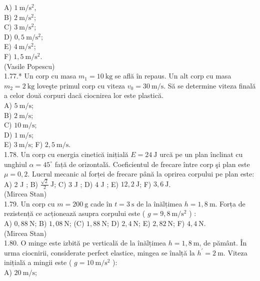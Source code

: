 \documentclass[10pt]{article}
\begin{document}
A) $1 \mathrm{~m} / \mathrm{s}^{2}$,\\
B) $2 \mathrm{~m} / \mathrm{s}^{2}$;\\
C) $3 \mathrm{~m} / \mathrm{s}^{2}$;\\
D) $0,5 \mathrm{~m} / \mathrm{s}^{2}$;\\
E) $4 \mathrm{~m} / \mathrm{s}^{2}$;\\
F) $1,5 \mathrm{~m} / \mathrm{s}^{2}$.\\
(Vasile Popescu)\\
1.77.* Un corp cu masa $m_{1}=10 \mathrm{~kg}$ se află în repaus. Un alt corp cu masa $m_{2}=2 \mathrm{~kg}$ loveşte primul corp cu viteza $v_{0}=30 \mathrm{~m} / \mathrm{s}$. Să se determine viteza finală a celor două corpuri dacă ciocnirea lor este plastică.\\
A) $5 \mathrm{~m} / \mathrm{s}$;\\
B) $2 \mathrm{~m} / \mathrm{s}$;\\
C) $10 \mathrm{~m} / \mathrm{s}$;\\
D) $1 \mathrm{~m} / \mathrm{s}$;\\
E) $3 \mathrm{~m} / \mathrm{s}$; F) $2,5 \mathrm{~m} / \mathrm{s}$.\\
1.78. Un corp cu energia cinetică inițială $E=24 \mathrm{~J}$ urcă pe un plan înclinat cu unghiul $\alpha=45^{\circ}$ față de orizontală. Coeficientul de frecare între corp şi plan este $\mu=0,2$. Lucrul mecanic al forței de frecare până la oprirea corpului pe plan este:\\
A) 2 J ; B) $\frac{\sqrt{2}}{2} \mathrm{~J}$; C) 3 J ; D) 4 J ; E) $12,2 \mathrm{~J}$; F) $3,6 \mathrm{~J}$.\\
(Mircea Stan)\\
1.79. Un corp cu $m=200 \mathrm{~g}$ cade în $t=3 \mathrm{~s}$ de la înălțimea $h=1,8 \mathrm{~m}$. Forța de rezistență ce acționează asupra corpului este ( $g=9,8 \mathrm{~m} / \mathrm{s}^{2}$ ) :\\
A) $0,88 \mathrm{~N}$; B) $1,08 \mathrm{~N}$; (C) $1,88 \mathrm{~N}$; D) $2,4 \mathrm{~N}$; E) $2,82 \mathrm{~N}$; F) $4,4 \mathrm{~N}$.\\
(Mircea Stan)\\
1.80. O minge este izbită pe verticală de la înălțimea $h=1,8 \mathrm{~m}$, de pământ. În urma ciocnirii, considerate perfect elastice, mingea se înalță la $h^{\prime}=2 \mathrm{~m}$. Viteza inițială a mingii este ( $g=10 \mathrm{~m} / \mathrm{s}^{2}$ ):\\
A) $20 \mathrm{~m} / \mathrm{s}$;\\
\end{document}
